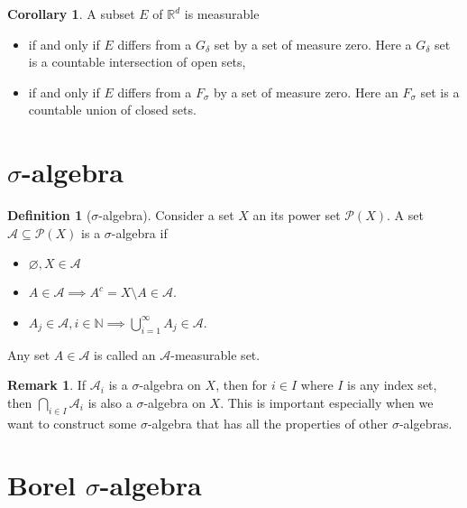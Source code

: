\documentclass{article}
\theoremstyle{definition}
\newcommand{\R}{\mathbb{R}}
\theoremstyle{theorem}
\newtheorem{definition}[theorem]{Definition}
\newtheorem{corollary}[theorem]{Corollary}
\newtheorem{remark}{Remark}
\begin{document}
\begin{corollary}
A subset $E$ of $\R^d$ is measurable 
\begin{itemize}
    \item if and only if $E$ differs from a $G_\delta$ set by a set of measure zero. Here a $G_\delta$ set is a countable intersection of open sets,
    
    \item if and only if $E$ differs from a $F_\sigma$ by a set of measure zero. Here an $F_\sigma$ set is a countable union of closed sets.
\end{itemize}
\end{corollary}





\section{$\sigma$-algebra}

\begin{definition}[$\sigma$-algebra]
Consider a set $X$ an its power set $\mathcal{P}(X)$. A set $\mathcal{A} \subseteq \mathcal{P}(X)$ is a $\sigma$-algebra if 
\begin{itemize}
    \item $\varnothing, X \in \mathcal{A} $
    \item $A\in \mathcal{A} \implies A^c = X\setminus A \in \mathcal{A}$.
    \item $A_j \in \mathcal{A}, i\in \mathbb{N} \implies \bigcup^\infty_{i=1} A_j \in \mathcal{A}$.
\end{itemize}
Any set $A\in \mathcal{A}$ is called an $\mathcal{A}$-measurable set. 
\end{definition}


\begin{remark}
If $\mathcal{A}_i$ is a $\sigma$-algebra on $X$, then for $i \in I$ where $I$ is any index set, then $\bigcap_{i\in I} \mathcal{A}_i$ is also a $\sigma$-algebra on $X$. This is important especially when we want to construct some $\sigma$-algebra that has all the properties of other $\sigma$-algebras.
\end{remark}


 






\section{Borel $\sigma$-algebra}
\end{document}
